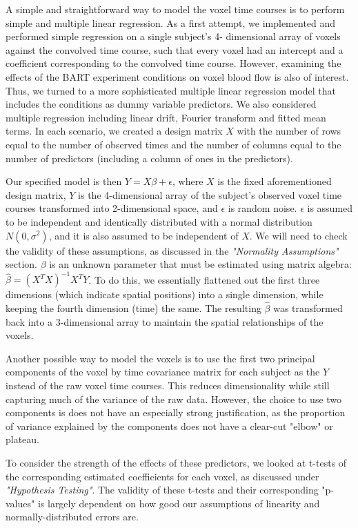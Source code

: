 \par \indent A simple and straightforward way to model the voxel time courses 
is to perform simple and multiple linear regression. As a first attempt, we 
implemented and performed simple regression on a single subject's 4-
dimensional array of voxels against the convolved time course, such that 
every voxel had an intercept and a coefficient corresponding to the convolved 
time course. However, examining the effects of the BART experiment conditions 
on voxel blood flow is also of interest. Thus, we turned to a more 
sophisticated multiple linear regression model that includes the conditions 
as dummy variable predictors. We also considered multiple regression including 
linear drift, Fourier transform and fitted mean terms. In each scenario, we 
created a design matrix $X$ with the number of rows equal to the number of 
observed times and the number of columns equal to the number of predictors 
(including a column of ones in the predictors). 

Our specified model is then $Y = X\beta + \epsilon$, where $X$ is the fixed 
aforementioned design matrix, $Y$ is the 4-dimensional array of the subject's 
observed voxel time courses transformed into 2-dimensional space, and $\epsilon$ 
is random noise. $\epsilon$ is assumed to be independent and identically 
distributed with a normal distribution $N(0, \sigma^2)$, and it is also assumed 
to be independent of $X$. We will need to check the validity of these 
assumptions, as discussed in the \textit{"Normality Assumptions"} section. 
$\beta$ is an unknown parameter that must be estimated using matrix algebra: 
$\hat{\beta} = (X^T X)^{-1} X^T Y$. To do this, we essentially flattened out the 
first three dimensions (which indicate spatial positions) into a single dimension, 
while keeping the fourth dimension (time) the same. The resulting $\hat{\beta}$ 
was transformed back into a 3-dimensional array to maintain the spatial 
relationships of the voxels. 

\par Another possible way to model the voxels is to use the first two principal 
components of the voxel by time covariance matrix for each subject as the $Y$ 
instead of the raw voxel time courses. This reduces dimensionality while still 
capturing much of the variance of the raw data. However, the choice to use two 
components is does not have an especially strong justification, as the proportion 
of variance explained by the components does not have a clear-cut "elbow" or 
plateau. 

\par To consider the strength of the effects of these predictors, we looked 
at t-tests of the corresponding estimated coefficients for each voxel, as 
discussed under \textit{"Hypothesis Testing"}. The validity of these t-tests and 
their corresponding "p-values" is largely dependent on how good our assumptions 
of linearity and normally-distributed errors are. 

